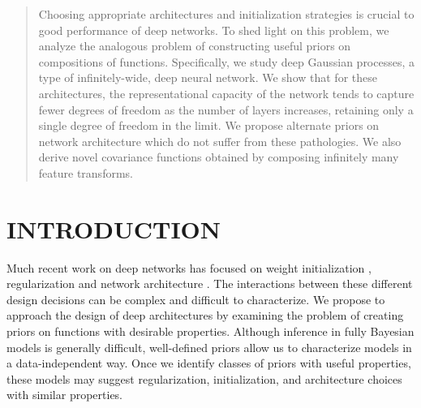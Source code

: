 \documentclass[twoside]{article}
\newcommand{\sectiondist}{}
\begin{document}




\begin{abstract}
Choosing appropriate architectures and initialization strategies is crucial to good performance of deep networks.  To shed light on this problem, we analyze the analogous problem of constructing useful priors on compositions of functions.  Specifically, we study deep Gaussian processes, a type of infinitely-wide, deep neural network.  We show that for these architectures, the representational capacity of the network tends to capture fewer degrees of freedom as the number of layers increases, retaining only a single degree of freedom in the limit.  We propose alternate priors on network architecture which do not suffer from these pathologies.  We also derive novel covariance functions obtained by composing infinitely many feature transforms.
\end{abstract}

\section{INTRODUCTION}
\sectiondist

Much recent work on deep networks has focused on weight initialization \citep{martens2010deep}, regularization \citep{lee2007sparse} and network architecture \citep{poon2011sum}.  The interactions between these different design decisions can be complex and difficult to characterize.  We propose to approach the design of deep architectures by examining the problem of creating priors on functions with desirable properties.  Although inference in fully Bayesian models is generally difficult, well-defined priors allow us to characterize models in a data-independent way.  Once we identify classes of priors with useful properties, these models may suggest regularization, initialization, and architecture choices with similar properties.
\end{document}

